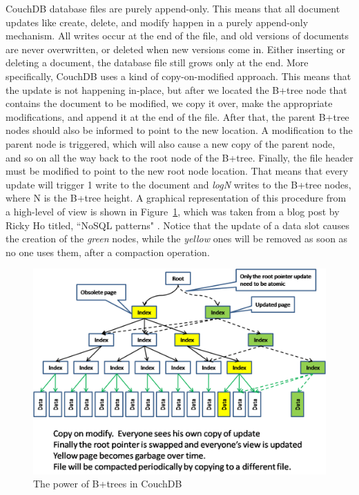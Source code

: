 \begin{description}
    CouchDB database files are purely append-only. This means that all document
    updates like create, delete, and modify happen in a purely append-only
    mechanism. All writes occur at the end of the file, and old versions of
    documents are never overwritten, or deleted when new versions come in. Either
    inserting or deleting a document, the database file still grows only at the
    end. More specifically, CouchDB uses a kind of copy-on-modified approach.
    This means that the update is not happening in-place, but after we located
    the B+tree node that contains the document to be modified, we copy it over,
    make the appropriate modifications, and append it at the end of the file.
    After that, the parent B+tree nodes should also be informed to point to the
    new location. A modification to the parent node is triggered, which will
    also cause a new copy of the parent node, and so on all the way back to the
    root node of the B+tree. Finally, the file header must be modified to point
    to the new root node location. That means that every update will trigger 1
    write to the document and \emph{logN} writes to the B+tree nodes, where N is
    the B+tree height. A graphical representation of this procedure from a
    high-level of view is shown in Figure~\ref{fig:btree}, which was taken from
    a blog post by Ricky Ho titled, ``NoSQL patterns"
    . Notice that
    the update of a data slot causes the creation of the \emph{green} nodes,
    while the \emph{yellow} ones will be removed as soon as no one uses them,
    after a compaction operation.

    \begin{figure}[htbp]
      \begin{center}
        \includegraphics[width=0.9\maxwidth]{../figures/b-tree.pdf}
        \caption{The power of B+trees in CouchDB\label{fig:btree}}
       \end{center}
    \end{figure}


\end{description}
